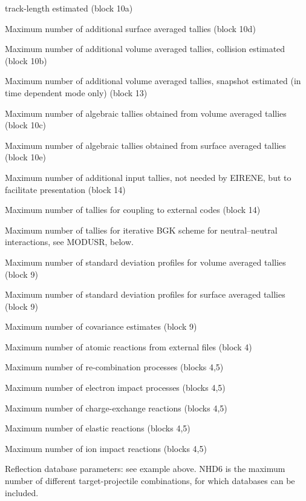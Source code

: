 \begin{description}
        track-length estimated (block 10a)
  \item[NADS] Maximum number of additional
        surface averaged tallies  (block 10d)
  \item[NCLV] Maximum number of additional
        volume averaged tallies, collision estimated (block 10b)
  \item[NSNV] Maximum
        number of additional volume averaged tallies, snapshot estimated (in time
        dependent mode only) (block 13)
  \item[NALV] Maximum number of algebraic tallies
        obtained from volume averaged tallies (block 10c)
  \item[NALS] Maximum number of
        algebraic tallies obtained from surface averaged tallies (block 10e)
  \item[NAIN] Maximum number of additional input tallies, not needed by EIRENE,
        but to facilitate presentation (block 14)
  \item[NCOP] Maximum number of tallies
        for coupling to external codes (block 14)
  \item[NBGK] Maximum number of tallies
        for iterative \ac{BGK} scheme for neutral--neutral interactions, see MODUSR,
        below.
  \item[NSD] Maximum number of standard deviation profiles for volume averaged
        tallies (block 9)
  \item[NSDW] Maximum number of standard deviation profiles for
        surface averaged tallies (block 9)
  \item[NCV] Maximum number of covariance
        estimates (block 9)
  \item[NREAC] Maximum number of atomic reactions from
        external files (block 4)
  \item[NRRC] Maximum number of re-combination processes
        (blocks 4,5)
  \item[NREI] Maximum number of electron impact processes (blocks
        4,5)
  \item[NRCX] Maximum number of charge-exchange reactions (blocks 4,5)
  \item[NREL] Maximum number of elastic reactions (blocks 4,5)
  \item[NRPI]
        Maximum number of ion impact reactions (blocks 4,5)
\end{description}
Reflection database parameters: see example above.
NHD6 is the maximum number of different target-projectile combinations, for
which databases can be included.
